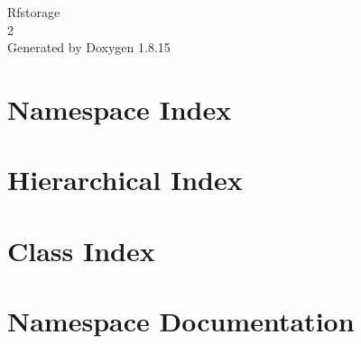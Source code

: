 \let\mypdfximage\pdfximage\def\pdfximage{\immediate\mypdfximage}\documentclass[twoside]{book}
\newcommand{\+}{\discretionary{\mbox{\scriptsize$\hookleftarrow$}}{}{}}
\newcommand{\clearemptydoublepage}{%
  \newpage{\pagestyle{empty}\cleardoublepage}%
}
\begin{document}
\begin{titlepage}
\vspace*{7cm}
\begin{center}%
{\Large Rfstorage \\[1ex]\large 2 }\\
\vspace*{1cm}
{\large Generated by Doxygen 1.8.15}\\
\end{center}
\end{titlepage}
\clearemptydoublepage
{}
\tableofcontents
\clearemptydoublepage
{}

\chapter{Namespace Index}

\chapter{Hierarchical Index}

\chapter{Class Index}

\chapter{Namespace Documentation}














\end{document}
